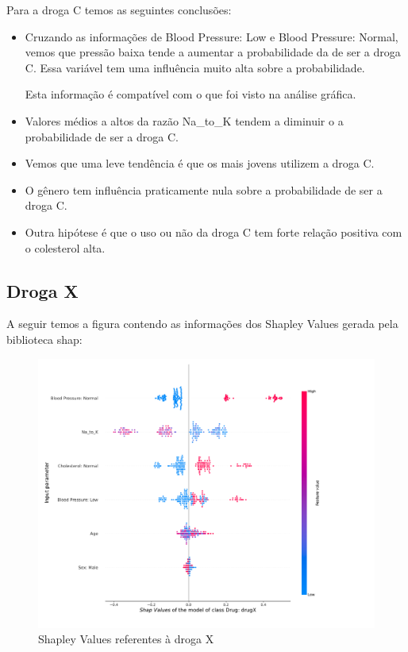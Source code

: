 \documentclass[12pt,a4paper]{article}
\theoremstyle{definition}
\theoremstyle{theoremdd}
\begin{document}
Para a droga C temos as seguintes conclusões:

\begin{itemize}
\item Cruzando as informações de Blood Pressure: Low e Blood Pressure: Normal, vemos que pressão baixa tende a aumentar a probabilidade da de ser a droga C. Essa variável tem uma influência muito alta sobre a probabilidade.

Esta informação é compatível com o que foi visto na análise gráfica.

\item Valores médios a altos da razão Na\_to\_K tendem a diminuir o a probabilidade de ser a droga C.

\item Vemos que uma leve tendência é que os mais jovens utilizem a droga C.

\item O gênero tem influência praticamente nula sobre a probabilidade de ser a droga C.

\item Outra hipótese é que o uso ou não da droga C tem forte relação positiva com o colesterol alta.
\end{itemize}


\subsection{Droga X}
A seguir temos a figura contendo as informações dos Shapley Values gerada pela biblioteca shap:
\begin{center}
\begin{figure}[H]
	\centering
	\includegraphics[scale=.40]{shap_drugX.pdf}
	\caption{Shapley Values referentes à droga X}
	\label{fig:05}
\end{figure}
\end{center}
\end{document}
